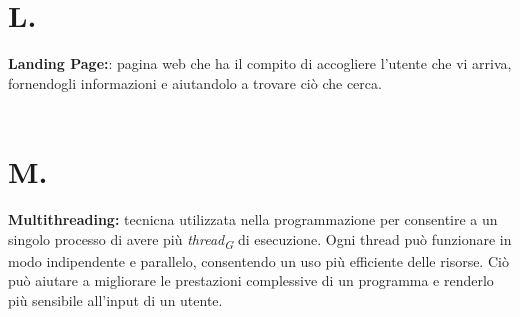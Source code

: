 \documentclass[a4paper, 12pt]{article}
\begin{document}
\newpage
\section*{L.}
\textbf{Landing Page:}: pagina web che ha il compito di accogliere l'utente che vi arriva, fornendogli informazioni e aiutandolo a trovare ciò che cerca. \\ \\

\newpage
\section*{M.}
\textbf{Multithreading:} tecnicna utilizzata nella programmazione per consentire a un singolo processo di avere più \textit{thread\textsubscript{G}} di esecuzione. Ogni thread può funzionare in modo indipendente e parallelo, consentendo un uso più efficiente delle risorse. Ciò può aiutare a migliorare le prestazioni complessive di un programma e renderlo più sensibile all'input di un utente. \\ \\

\newpage
\end{document}
